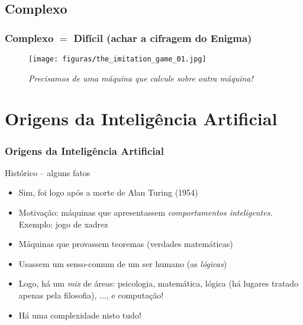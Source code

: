 \documentclass{beamer}
\begin{document}
\subsection{Complexo}
\begin{frame}

\frametitle{Complexo $=$ Difícil (achar a cifragem do Enigma)}

\begin{figure}[ht!]
 \centering
 \texttt{[image: figuras/the\_imitation\_game\_01.jpg]}

\caption{\textit{Precisamos de uma máquina que calcule sobre outra máquina!}} 

\end{figure}


\end{frame}




\section{Origens da Inteligência Artificial}

\begin{frame}[fragile]
\frametitle{Origens da Inteligência Artificial}

\begin{block}{Histórico  -- alguns fatos}
  \begin{itemize}
   \item Sim, foi logo após a morte de Alan Turing (1954)

    \item Motivação: máquinas que apresentassem \emph{comportamentos  inteligentes}. Exemplo: jogo de xadrez
\pause

    \item Máquinas que provassem teoremas (verdades matemáticas)


  \item Usassem um senso-comum de um ser humano (as \textit{lógicas})
\pause

    \item Logo, há um \textit{mix} de áreas: psicologia, matemática, lógica (há lugares tratado apenas pela filosofia), ..., e computação!
\pause    
        \item Há uma complexidade nisto tudo! 
    \end{itemize}
  
\end{block}

\end{frame}
\end{document}
